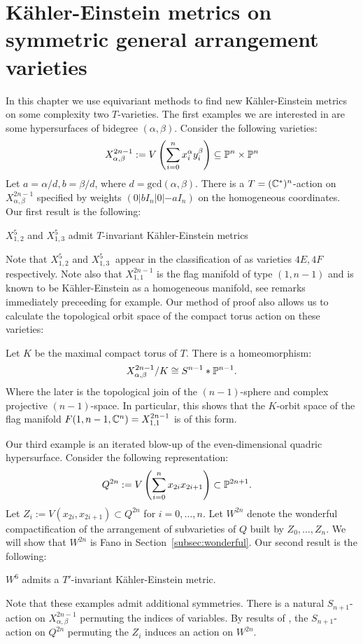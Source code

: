 \chapter{K\"ahler-Einstein metrics on symmetric general arrangement varieties} \label{chap:gav}
In this chapter we use equivariant methods to find new K\"ahler-Einstein metrics on some complexity two \(T\)-varieties. The first examples we are interested in are some hypersurfaces of  bidegree \((\alpha,\beta)\). Consider the following varieties:
\[
X_{\alpha,\beta}^{2n-1} := V \left( \sum_{i=0}^n x_i^\alpha y_i^\beta \right) \subseteq \mathbb{P}^n \times \mathbb{P}^n
\]
%
%
Let \(a = \alpha/d, b = \beta/d\), where \(d = \text{gcd}(\alpha,\beta)\). There is a \(T = (\mathbb{C}^*)^n\)-action on \(X_{\alpha,\beta}^{2n-1}\) specified by weights \((0|b I_n|0|-a I_n)\) on the homogeneous coordinates. Our first result is the following:
\begin{theorem}\label{thm:KE1}
\(X_{1,2}^5\) and \( X_{1,3}^5\) admit \(T\)-invariant K\"ahler-Einstein metrics
\end{theorem}
Note that \(X_{1,2}^5\) and \(X_{1,3}^5\ \) appear in the classification of \cite{hausen2018torus} as varieties \(4E, 4F\) respectively. Note also that \(X_{1,1}^{2n-1}\) is the flag manifold of type \((1,n-1)\) and is known to be K\"ahler-Einstein as a homogeneous manifold, see remarks immediately preceeding \cite[Theorem 3]{Matsushima} for example. Our method of proof also allows us to calculate the topological orbit space of the compact torus action on these varieties:
\begin{corollary}\label{cor:topquot}
Let \(K\) be the maximal compact torus of \(T\). There is a homeomorphism:
\[
X_{\alpha,\beta}^{2n-1}/K \cong S^{n-1} \ast \mathbb{P}^{n-1}.
\]
Where the later is the topological join of the \((n-1)\)-sphere and complex projective \((n-1)\)-space. In particular, this shows that the \(K\)-orbit space of the flag manifold \(F(1,n-1,\mathbb{C}^n) = X_{1,1}^{2n-1}\) is of this form.
\end{corollary}
Our third example is an iterated blow-up of the even-dimensional quadric hypersurface. Consider the following representation:
\begin{align*}
Q^{2n} &:= V \left( \sum_{i=0}^{n} x_{2i}x_{2i+1} \right) \subset \mathbb{P}^{2n+1}.
\end{align*}
Let \(Z_i := V(x_{2i},x_{2i+1}) \subset Q^{2n}\) for \(i=0,\dots,n\). Let \(W^{2n}\) denote the wonderful compactification of the arrangement of subvarieties of \(Q\) built by \(Z_0,\dots,Z_n\). We will show that \(W^{2n}\) is Fano in Section~\ref{subsec:wonderful}. Our second result is the following:
\begin{theorem}\label{thm:KE2}
\(W^6\) admits a \(T'\)-invariant K\"ahler-Einstein metric.
\end{theorem}
Note that these examples admit additional symmetries. There is a natural \(S_{n+1}\)-action on \(X^{2n-1}_{\alpha,\beta}\) permuting the indices of variables. By results of \cite{li06}, the \(S_{n+1}\)-action on \(Q^{2n}\) permuting the \(Z_i\) induces an action on \(W^{2n}\).
